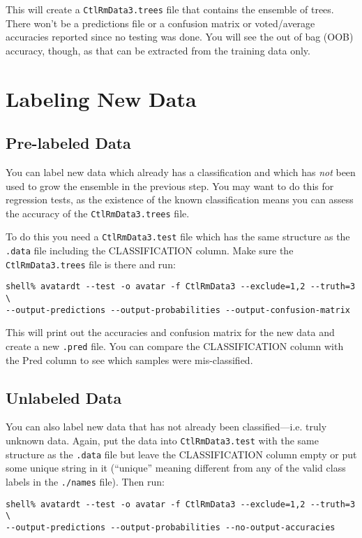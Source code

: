 \documentclass{article}
\begin{document}
This will create a \verb=CtlRmData3.trees= file that contains the ensemble of trees. There won't be
a predictions file or a confusion matrix or voted/average accuracies reported since no testing was
done. You will see the out of bag (OOB) accuracy, though, as that can be extracted from the training
data only. 

\section{Labeling New Data}
\subsection{Pre-labeled Data}

You can label new data which already has a classification and which has \emph{not} been used
to grow the ensemble in the previous step. You may want to do this for regression tests, as the
existence of the known classification means you can assess the accuracy of the
\verb=CtlRmData3.trees=  file. 

To do this you need a \verb=CtlRmData3.test= file which has the same structure as the \verb=.data=
file including the CLASSIFICATION column. Make sure the \verb=CtlRmData3.trees= file is there
and run:

\begin{verbatim}
shell% avatardt --test -o avatar -f CtlRmData3 --exclude=1,2 --truth=3 \
--output-predictions --output-probabilities --output-confusion-matrix
\end{verbatim}

This will print out the accuracies and confusion matrix for the new data and create a new 
\verb=.pred= file. You can compare the CLASSIFICATION column with the Pred column to see
which samples were mis-classified.

\subsection{Unlabeled Data}

You can also label new data that has not already been classified---i.e. truly unknown data.
Again, put the data into \verb=CtlRmData3.test= with the same structure as the \verb=.data=
file but leave the CLASSIFICATION column empty or put some unique string in it (``unique''
meaning different from any of the valid class labels in the \verb=./names= file). Then run:

\begin{verbatim}
shell% avatardt --test -o avatar -f CtlRmData3 --exclude=1,2 --truth=3 \
--output-predictions --output-probabilities --no-output-accuracies
\end{verbatim}
\end{document}
